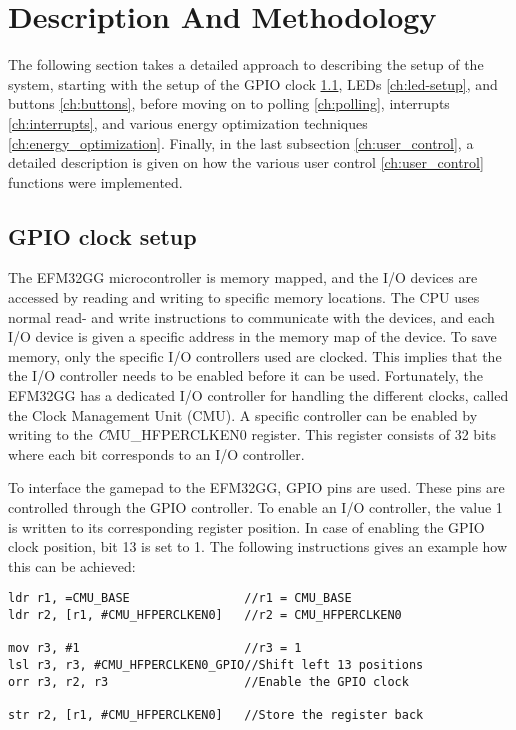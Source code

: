 \section{Description And Methodology}

The following section takes a detailed approach to describing the setup of the system, starting with the setup of the GPIO clock \ref{ch:initial_setup}, LEDs \ref{ch:led-setup}, and buttons \ref{ch:buttons}, before moving on to polling \ref{ch:polling}, interrupts \ref{ch:interrupts}, and various energy optimization techniques \ref{ch:energy_optimization}. Finally, in the last subsection \ref{ch:user_control}, a detailed description is given on how the various user control \ref{ch:user_control} functions were implemented.


\subsection{GPIO clock setup} \label{ch:initial_setup}
The EFM32GG microcontroller is memory mapped, and the I/O devices are accessed by reading and writing to specific memory locations. The CPU uses normal read- and write instructions to communicate with the devices, and each I/O device is given a specific address in the memory map of the device. To save memory, only the specific I/O controllers used are clocked. This implies that the the I/O controller needs to be enabled before it can be used. Fortunately, the EFM32GG has a dedicated I/O controller for handling the different clocks, called the Clock Management Unit (CMU). A specific controller can be enabled by writing to the \emph CMU\_HFPERCLKEN0 register. This register consists of 32 bits where each bit corresponds to an I/O controller.

To interface the gamepad to the EFM32GG, GPIO pins are used. These pins are controlled through the GPIO controller. To enable an I/O controller, the value 1 is written to its corresponding register position. In case of enabling the GPIO clock position, bit 13 is set to 1. The following instructions gives an example how this can be achieved: 

\begin{lstlisting}
ldr r1, =CMU_BASE                //r1 = CMU_BASE
ldr r2, [r1, #CMU_HFPERCLKEN0]   //r2 = CMU_HFPERCLKEN0 

mov r3, #1                       //r3 = 1
lsl r3, r3, #CMU_HFPERCLKEN0_GPIO//Shift left 13 positions
orr r3, r2, r3                   //Enable the GPIO clock

str r2, [r1, #CMU_HFPERCLKEN0]   //Store the register back 
\end{lstlisting}

